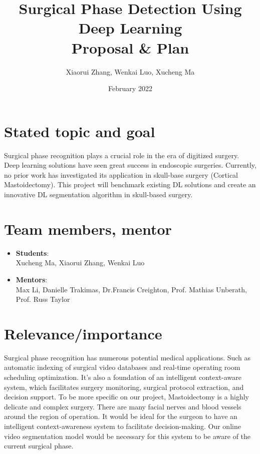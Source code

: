 \documentclass[11pt]{article} \usepackage[top=1in, bottom=1in, left=1in, right=1in]{geometry}
\title{Surgical Phase Detection Using Deep Learning\\ Proposal \& Plan}
\author{Xiaorui Zhang, Wenkai Luo, Xucheng Ma}
\date{February 2022}
\begin{document}
\maketitle

\section{Stated topic and goal}
Surgical phase recognition plays a crucial role in the era of digitized surgery. Deep learning solutions have seen great success in endoscopic surgeries. Currently, no prior work has investigated its application in skull-base surgery (Cortical Mastoidectomy). This project will benchmark existing DL solutions and create an innovative DL segmentation algorithm in skull-based surgery.

\section{Team members, mentor}
\begin{itemize}
    \item \textbf{Students}:\\Xucheng Ma, Xiaorui Zhang, Wenkai Luo
    \item \textbf{Mentors}:\\Max Li, Danielle Trakimas, Dr.Francis Creighton, Prof. Mathias Unberath, Prof. Russ Taylor
\end{itemize}

\section{Relevance/importance}
Surgical phase recognition has numerous potential medical applications. Such as automatic indexing of surgical video databases and real-time operating room scheduling optimization. It’s also a foundation of an intelligent context-aware system, which facilitates surgery monitoring, surgical protocol extraction, and decision support. To be more specific on our project, Mastoidectomy is a highly delicate and complex surgery. There are many facial nerves and blood vessels around the region of operation. It would be ideal for the surgeon to have an intelligent context-awareness system to facilitate decision-making. Our online video segmentation model would be necessary for this system to be aware of the current surgical phase. 
\end{document}
